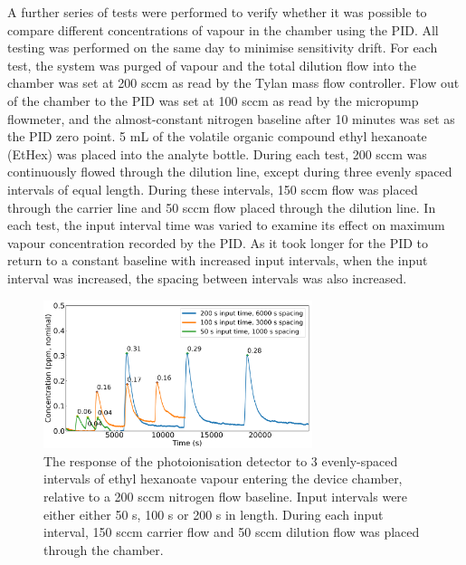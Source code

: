 \documentclass[
  a4paper,
]{scrbook}
\begin{document}
A further series of tests were performed to verify whether it was
possible to compare different concentrations of vapour in the chamber
using the PID. All testing was performed on the same day to minimise
sensitivity drift. For each test, the system was purged of vapour and
the total dilution flow into the chamber was set at 200 sccm as read by
the Tylan mass flow controller. Flow out of the chamber to the PID was
set at 100 sccm as read by the micropump flowmeter, and the
almost-constant nitrogen baseline after 10 minutes was set as the PID
zero point. 5 mL of the volatile organic compound ethyl hexanoate
(EtHex) was placed into the analyte bottle. During each test, 200 sccm
was continuously flowed through the dilution line, except during three
evenly spaced intervals of equal length. During these intervals, 150
sccm flow was placed through the carrier line and 50 sccm flow placed
through the dilution line. In each test, the input interval time was
varied to examine its effect on maximum vapour concentration recorded by
the PID. As it took longer for the PID to return to a constant baseline
with increased input intervals, when the input interval was increased,
the spacing between intervals was also increased.

\begin{figure}

{\centering \includegraphics[width=0.7\textwidth,height=\textheight]{figures/ch5/input_time_comparison.png}

}

\caption{\label{fig-concentration-comparison}The response of the
photoionisation detector to 3 evenly-spaced intervals of ethyl hexanoate
vapour entering the device chamber, relative to a 200 sccm nitrogen flow
baseline. Input intervals were either either 50 s, 100 s or 200 s in
length. During each input interval, 150 sccm carrier flow and 50 sccm
dilution flow was placed through the chamber.}

\end{figure}
\end{document}

